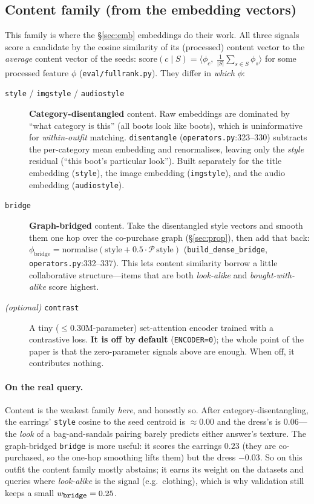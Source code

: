 \documentclass[11pt]{article}
\theoremstyle{remark}
\newcommand{\code}[1]{\texttt{\small #1}}
\begin{document}
\subsection{Content family (from the embedding vectors)}
\label{sec:content}

This family is where the \S\ref{sec:emb} embeddings do their work. All three signals score a candidate by the cosine
similarity of its (processed) content vector to the \emph{average} content vector of the seeds:
$\mathrm{score}(c\mid S)=\big\langle \phi_c,\ \tfrac1{|S|}\sum_{s\in S}\phi_s\big\rangle$ for some processed feature
$\phi$ (\code{eval/fullrank.py}). They differ in \emph{which} $\phi$:

\begin{description}
\item[\code{style} / \code{imgstyle} / \code{audiostyle}] \textbf{Category-disentangled} content. Raw embeddings are
dominated by ``what category is this'' (all boots look like boots), which is uninformative for \emph{within-outfit}
matching. \code{disentangle} (\code{operators.py}:323--330) subtracts the per-category mean embedding and
renormalises, leaving only the \emph{style} residual (``this boot's particular look''). Built separately for the
title embedding (\code{style}), the image embedding (\code{imgstyle}), and the audio embedding (\code{audiostyle}).
\item[\code{bridge}] \textbf{Graph-bridged} content. Take the disentangled style vectors and smooth them one hop over
the co-purchase graph (\S\ref{sec:prop}), then add that back: $\phi_{\text{bridge}}=\mathrm{normalise}(\text{style}+0.5\cdot
\mathcal{P}\,\text{style})$ (\code{build\_dense\_bridge}, \code{operators.py}:332--337). This lets content similarity
borrow a little collaborative structure---items that are both \emph{look-alike} and \emph{bought-with-alike} score
highest.
\item[\textit{(optional)} \code{contrast}] A tiny ($\le 0.30$M-parameter) set-attention encoder trained with a
contrastive loss. \textbf{It is off by default} (\code{ENCODER=0}); the whole point of the paper is that the
zero-parameter signals above are enough. When off, it contributes nothing.
\end{description}

\paragraph{On the real query.} Content is the weakest family \emph{here}, and honestly so. After
category-disentangling, the earrings' \code{style} cosine to the seed centroid is $\approx 0.00$ and the dress's is
$0.06$---the \emph{look} of a bag-and-sandals pairing barely predicts either answer's texture. The graph-bridged
\code{bridge} is more useful: it scores the earrings $0.23$ (they are co-purchased, so the one-hop smoothing lifts
them) but the dress $-0.03$. So on this outfit the content family mostly abstains; it earns its weight on the
datasets and queries where \emph{look-alike} is the signal (e.g.\ clothing), which is why validation still keeps a
small $w_{\code{bridge}}=0.25$.
\end{document}
